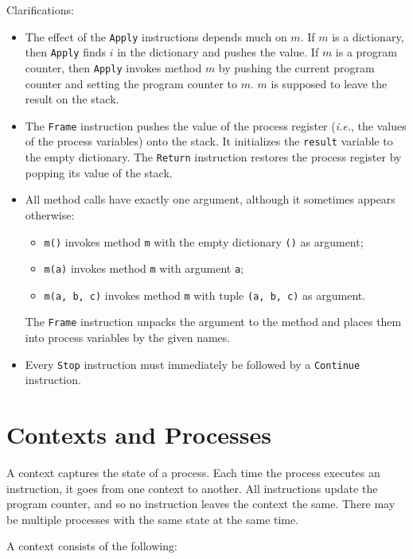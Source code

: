 \documentclass{report}
\begin{document}
Clarifications:
\begin{itemize}
\item The effect of the \texttt{Apply} instructions depends much on $m$.
If $m$ is a dictionary, then \texttt{Apply} finds $i$ in the dictionary
and pushes the value.
If $m$ is a program counter, then \texttt{Apply} invokes method $m$ by
pushing the current program counter and setting the program counter to
$m$.  $m$ is supposed to leave the result on the stack.
\item The \texttt{Frame} instruction pushes the value of the process
register (\emph{i.e.}, the values of the process variables) onto the
stack.  It initializes the \texttt{result} variable to the empty dictionary.
The \texttt{Return} instruction restores the process register by popping
its value of the stack.
\item All method calls have exactly one argument, although it sometimes
appears otherwise:
\begin{itemize}
\item \texttt{m()} invokes method \texttt{m} with the empty dictionary \texttt{()} as argument;
\item \texttt{m(a)} invokes method \texttt{m} with argument \texttt{a};
\item \texttt{m(a, b, c)} invokes method \texttt{m} with tuple \texttt{(a, b, c)} as argument.
\end{itemize}
The \texttt{Frame} instruction unpacks the argument to the method and places them into process variables by the given names.
\item Every \texttt{Stop} instruction must immediately be followed by a 
\texttt{Continue} instruction.
\end{itemize}

\chapter{Contexts and Processes}
\label{app:context}

A context captures the state of a process.  Each time the process
executes an instruction, it goes from one context to another.
All instructions update the program counter, and so no instruction
leaves the context the same.
There may be multiple processes
with the same state at the same time.

A context consists of the following:
\end{document}
